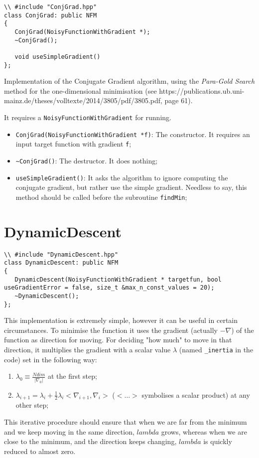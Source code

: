 \documentclass[11pt,a4paper,twoside]{article}
\begin{document}
\begin{lstlisting}
\\ #include "ConjGrad.hpp"
class ConjGrad: public NFM
{
   ConjGrad(NoisyFunctionWithGradient *);
   ~ConjGrad();

   void useSimpleGradient()
};
\end{lstlisting}

Implementation of the Conjugate Gradient algorithm, using the \emph{Para-Gold Search} method for the one-dimensional minimisation (see https://publications.ub.uni-mainz.de/theses/volltexte/2014/3805/pdf/3805.pdf, page 61).

It requires a \verb+NoisyFunctionWithGradient+ for running.

\begin{itemize}
\item \verb+ConjGrad(NoisyFunctionWithGradient *f)+: The constructor. It requires an input target function with gradient \verb+f+;
\item \verb+~ConjGrad()+: The destructor. It does nothing;
\item \verb+useSimpleGradient()+: It asks the algorithm to ignore computing the conjugate gradient, but rather use the simple gradient. Needless to say, this method should be called before the subroutine \verb+findMin+;
\end{itemize}





\section{DynamicDescent} %
\label{sec:dynamicdescent}

\begin{lstlisting}
\\ #include "DynamicDescent.hpp"
class DynamicDescent: public NFM
{
   DynamicDescent(NoisyFunctionWithGradient * targetfun, bool useGradientError = false, size_t &max_n_const_values = 20);
   ~DynamicDescent();
};
\end{lstlisting}

This implementation is extremely simple, however it can be useful in certain circumstances. To minimise the function it uses the gradient (actually $-\nabla$) of the function as direction for moving. For deciding "how much" to move in that direction, it multiplies the gradient with a scalar value $\lambda$ (named \verb+_inertia+ in the code) set in the following way:
\begin{enumerate}
\item $\lambda_0 \equiv \frac{Ndim}{\left| \nabla_0 \right|}$ at the first step;
\item $\lambda_{i+1} = \lambda_i + \frac{1}{2} \lambda_i <\nabla_{i+1}, \nabla_i>$ ($< \dots >$ symbolises a scalar product) at any other step;
\end{enumerate}
This iterative procedure should ensure that when we are far from the minimum and we keep moving in the same direction, $lambda$ grows, whereas when we are close to the minimum, and the direction keeps changing, $lambda$ is quickly reduced to almost zero.
\end{document}
